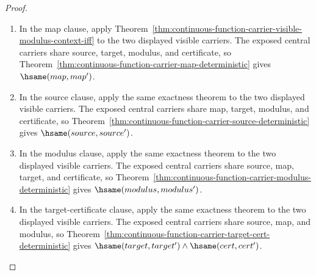 \begin{proof}
\begin{enumerate}
\item In the map clause, apply
Theorem~\ref{thm:continuous-function-carrier-visible-modulus-context-iff} to
the two displayed visible carriers. The exposed central carriers share source,
target, modulus, and certificate, so
Theorem~\ref{thm:continuous-function-carrier-map-deterministic} gives
$\hsame(map,map')$.

\item In the source clause, apply the same exactness theorem to the two
displayed visible carriers. The exposed central carriers share map, target,
modulus, and certificate, so
Theorem~\ref{thm:continuous-function-carrier-source-deterministic} gives
$\hsame(source,source')$.

\item In the modulus clause, apply the same exactness theorem to the two
displayed visible carriers. The exposed central carriers share source, map,
target, and certificate, so
Theorem~\ref{thm:continuous-function-carrier-modulus-deterministic} gives
$\hsame(modulus,modulus')$.

\item In the target-certificate clause, apply the same exactness theorem to
the two displayed visible carriers. The exposed central carriers share source,
map, and modulus, so
Theorem~\ref{thm:continuous-function-carrier-target-cert-deterministic} gives
$\hsame(target,target')\land\hsame(cert,cert')$.
\end{enumerate}
\end{proof}

